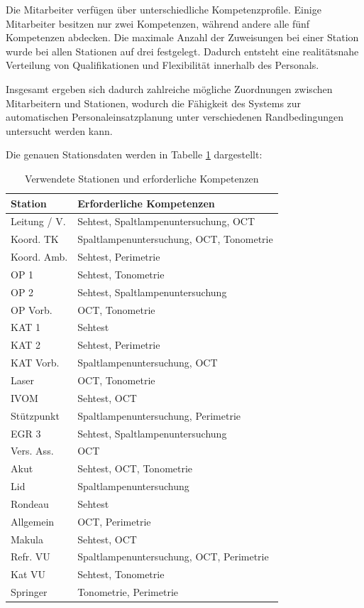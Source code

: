  Die Mitarbeiter verfügen über unterschiedliche Kompetenzprofile. Einige Mitarbeiter besitzen nur zwei Kompetenzen, während andere alle fünf Kompetenzen abdecken. Die maximale Anzahl der Zuweisungen bei einer Station wurde bei allen Stationen auf drei festgelegt. Dadurch entsteht eine realitätsnahe Verteilung von Qualifikationen und Flexibilität innerhalb des Personals.

 
 Insgesamt ergeben sich dadurch zahlreiche mögliche Zuordnungen zwischen Mitarbeitern und Stationen, wodurch die Fähigkeit des Systems zur automatischen Personaleinsatzplanung unter verschiedenen Randbedingungen untersucht werden kann. 
 
 Die genauen Stationsdaten werden in Tabelle \ref{tab:test-stations} dargestellt:
 
 \begin{table}[H]
 	\centering
 	\caption{Verwendete Stationen und erforderliche Kompetenzen}
 	\label{tab:test-stations}
 	\begin{tabularx}{\linewidth}{l >{\raggedright\arraybackslash}X}
 		\toprule
 		\textbf{Station} & \textbf{Erforderliche Kompetenzen} \\
 		\midrule
 		Leitung / V. & Sehtest, Spaltlampenuntersuchung, OCT \\
 		Koord. TK & Spaltlampenuntersuchung, OCT, Tonometrie \\
 		Koord. Amb. & Sehtest, Perimetrie \\
 		OP 1 & Sehtest, Tonometrie \\
 		OP 2 & Sehtest, Spaltlampenuntersuchung \\
 		OP Vorb. & OCT, Tonometrie \\
 		KAT 1 & Sehtest \\
 		KAT 2 & Sehtest, Perimetrie \\
 		KAT Vorb. & Spaltlampenuntersuchung, OCT \\
 		Laser & OCT, Tonometrie \\
 		IVOM & Sehtest, OCT \\
 		Stützpunkt & Spaltlampenuntersuchung, Perimetrie \\
 		EGR 3 & Sehtest, Spaltlampenuntersuchung \\
 		Vers. Ass. & OCT \\
 		Akut & Sehtest, OCT, Tonometrie \\
 		Lid & Spaltlampenuntersuchung \\
 		Rondeau & Sehtest \\
 		Allgemein & OCT, Perimetrie \\
 		Makula & Sehtest, OCT \\
 		Refr. VU & Spaltlampenuntersuchung, OCT, Perimetrie \\
 		Kat VU & Sehtest, Tonometrie \\
 		Springer & Tonometrie, Perimetrie \\
 		\bottomrule
 	\end{tabularx}
 \end{table}
 
